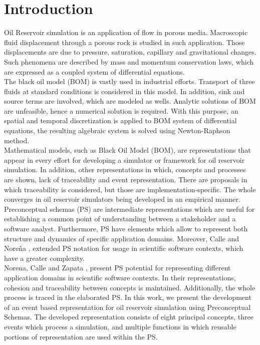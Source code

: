 \documentclass[review]{elsarticle}
\begin{document}
\linenumbers

\section{Introduction}
Oil Reservoir simulation is an application of flow in porous media. Macroscopic fluid displacement through a porous rock is studied in such application. Those displacements are due to pressure, saturation, capillary and gravitational changes. Such phenomena are described by mass and momentum conservation laws, which are expressed as a coupled system of differential equations.\\

The black oil model (BOM) is vastly used in industrial efforts. Transport of three fluids at standard conditions is considered in this model. In addition, sink and source terms are involved, which are modeled as wells. Analytic solutions of BOM are unfeasible, hence a numerical solution is required. With this purpose, an spatial and temporal discretization is applied to BOM system of differential equations, the resulting algebraic system is solved using Newton-Raphson method.\\

Mathematical models, such as Black Oil Model (BOM), are representations that appear in every effort for developing a simulator or framework for oil reservoir simulation. In addition, other representations in which, concepts and processes are shown, lack of traceability and event representation. There are proposals in which traceability is considered, but those are implementation-specific. The whole converges in oil reservoir simulators being developed in an empirical manner.\\

Preconceptual schemas (PS) are intermediate representations which are useful for establishing a common point of understanding between a stakeholder and a software analyst. Furthermore, PS have elements which allow to represent both structure and dynamics of specific application domains. Moreover, Calle and Nore\~na \cite{JCalle}, extended PS notation for usage in scientific software contexts, which have a greater complexity.\\

Norena, Calle and Zapata \cite{JCalle, norena2018Ling, norena2018bs, norena2018det, norena2018ruido, norena2018timrep}, present PS potential for representing different application domains in scientific software contexts. In their representations, cohesion and traceability between concepts is maintained. Additionally, the whole process is traced in the elaborated PS. In this work, we present the development of an event based representation for oil reservoir simulation using Preconceptual Schemas. The developed representation consists of eight principal concepts, three events which process a simulation, and multiple functions in which reusable portions of representation are used within the PS.\\
\end{document}
